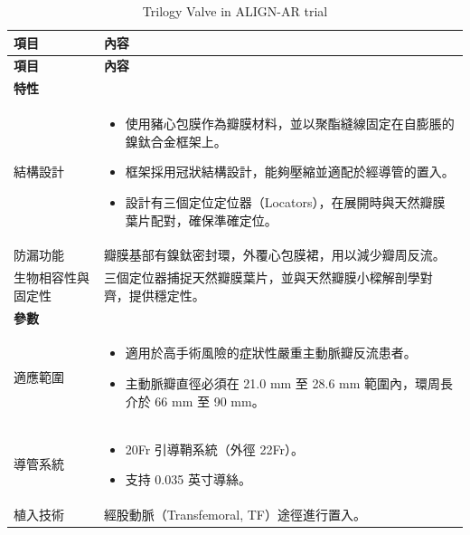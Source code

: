 \documentclass[nols]{tufte-book}
\begin{document}
\begin{longtable}{p{3cm}p{9cm}}
\caption{Trilogy Valve in ALIGN-AR trial}
\hline
\textbf{項目} & \textbf{內容} \\
\hline
\endfirsthead

\hline
\textbf{項目} & \textbf{內容} \\
\hline
\endhead

\hline
\endfoot

\hline
\textbf{特性} & \\
\hline
結構設計 & 
\begin{itemize}
    \item 使用豬心包膜作為瓣膜材料，並以聚酯縫線固定在自膨脹的鎳鈦合金框架上。
    \item 框架採用冠狀結構設計，能夠壓縮並適配於經導管的置入。
    \item 設計有三個定位定位器（Locators），在展開時與天然瓣膜葉片配對，確保準確定位。
\end{itemize} \\
\hline
防漏功能 & 瓣膜基部有鎳鈦密封環，外覆心包膜裙，用以減少瓣周反流。 \\
\hline
生物相容性與固定性 & 三個定位器捕捉天然瓣膜葉片，並與天然瓣膜小樑解剖學對齊，提供穩定性。 \\
\hline

\textbf{參數} & \\
\hline
適應範圍 & 
\begin{itemize}
    \item 適用於高手術風險的症狀性嚴重主動脈瓣反流患者。
    \item 主動脈瓣直徑必須在 21.0 mm 至 28.6 mm 範圍內，環周長介於 66 mm 至 90 mm。
\end{itemize} \\
\hline
導管系統 & 
\begin{itemize}
    \item 20Fr 引導鞘系統（外徑 22Fr）。
    \item 支持 0.035 英寸導絲。
\end{itemize} \\
\hline
植入技術 & 經股動脈（Transfemoral, TF）途徑進行置入。 \\
\hline


\end{longtable}
\end{document}
